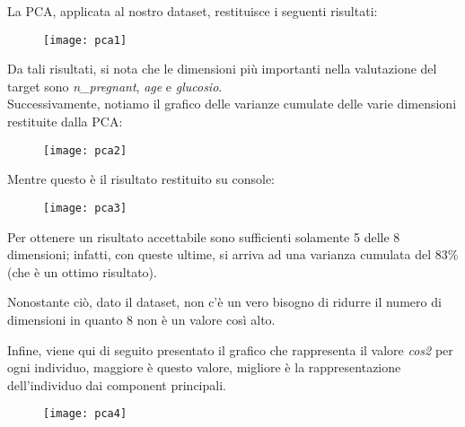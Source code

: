 \newpage

La PCA, applicata al nostro dataset, restituisce i seguenti risultati:
\begin{figure}[H]
	\centering
	\texttt{[image: pca1]}
\end{figure}
Da tali risultati, si nota che le dimensioni più importanti nella valutazione del target sono \textit{n\_pregnant}, \textit{age} e \textit{glucosio}.\\
Successivamente, notiamo il grafico delle varianze cumulate delle varie dimensioni restituite dalla PCA:

\begin{figure}[H]
	\centering
	\texttt{[image: pca2]}
\end{figure}

Mentre questo è il risultato restituito su console:
\begin{figure}[H]
	\centering
	\texttt{[image: pca3]}
\end{figure}

Per ottenere un risultato accettabile sono sufficienti solamente 5 delle 8 dimensioni; infatti, con queste ultime, si arriva ad una varianza cumulata del 83\% (che è un ottimo risultato).

Nonostante ciò, dato il dataset, non c'è un vero bisogno di ridurre il numero di dimensioni in quanto 8 non è un valore così alto.

Infine, viene qui di seguito presentato il grafico che rappresenta il valore \textit{cos2} per ogni individuo, maggiore è questo valore, migliore è la rappresentazione dell'individuo dai component principali.
\begin{figure}[H]
	\centering
	\texttt{[image: pca4]}
\end{figure}





